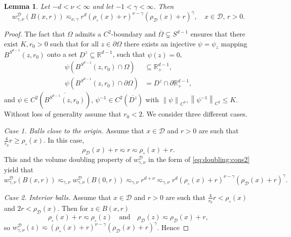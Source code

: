 \documentclass[12pt,a4paper, reqno]{amsart}
\theoremstyle{plain}
\newtheorem{lemma}[theorem]{Lemma}
\theoremstyle{definition}
\theoremstyle{remark}
\numberwithin{equation}{section}
\newcommand{\1}{\mathbbm{1}}
\newcommand{\R}{\ensuremath{\mathbb{R}}}
\newcommand{\calD}{\ensuremath{\mathcal{D}}}
\newcommand{\nrm}[1]{\left\lVert #1 \right\rVert}
\begin{document}
\begin{lemma}\label{mixedweight:estimate:ball}
Let $-d<\nu<\infty$ and let $-1<\gamma<\infty$. Then 
\begin{equation}
    w_{\gamma,\nu}^\calD(B(x,r))
    \eqsim_{\nu,\gamma} 
    r^d(\rho_\circ(x)+r)^{\nu-\gamma}(\rho_{\calD}(x)+r)^\gamma, \quad x\in \calD,\,r>0.
\end{equation}
\end{lemma}
\begin{proof} 
The fact that $\Omega$ admits a $C^2$-boundary and $\overline{\Omega}\subsetneq S^{d-1}$ ensures that there exist $K,r_0 >0$ such that for all $z\in \partial\Omega$ there exists an injective $\psi=\psi_z$ mapping $B^{S^{d-1}}(z,r_0)$ onto a set $D^z\subseteq \R^{d-1}$, such that  $ \psi(z)=0$,
\begin{align*}
    \psi(B^{S^{d-1}}(z,r_0)\cap\Omega) &\subseteq \R^{d-1}_+,\\
    \psi(B^{S^{d-1}}(z,r_0)\cap\partial \Omega)&= D^z\cap \partial\R^{d-1}_+,%
\end{align*}
and $\psi\in C^2(\overline{B^{S^{d-1}}(z,r_0)})$, $\psi^{-1}\in C^2(\overline{D^z})$
 with $\nrm{\psi}_{C^2},\nrm{\psi^{-1}}_{C^2}\le K$.  
 Without loss of generality assume that $r_0<2.$
We consider three different cases. 

\medskip

\noindent \emph{Case 1. Balls close to the origin.} Assume that $x\in \calD$ and $r>0$ are such that $\frac{4}{r_0} r\geq \rho_\circ(x)$. 
In this case,
\[
\rho_\calD(x)+r \eqsim r \eqsim \rho_\circ(x)+r.
\]
This and the volume doubling property of $w_{\gamma,\nu}^\calD$
in the form of \eqref{eq:doubling:cons2}
yield that
\[
	w_{\gamma,\nu}^\calD(B(x,r))
    \eqsim_{\gamma,\nu} 
    w_{\gamma,\nu}^\calD(B(0,r))
    \eqsim_{\gamma,\nu} 
    r^{d+\nu}
    \eqsim_{\gamma,\nu} 
    r^d(\rho_\circ(x)+r)^{\nu-\gamma}(\rho_\calD(x)+r)^\gamma.
\]

\medskip

\noindent \emph{Case 2. Interior balls.} Assume that $x\in \calD$ and $r>0$ are such that $\frac{4}{r_0} r<\rho_\circ(x)$ and $2r< \rho_\calD(x)$. 
Then for $z\in B(x,r)$
\begin{equation}\label{eq:mixedweights:equiv1}
\rho_\circ(x)+r \eqsim \rho_\circ(z) \quad\text{and}\quad \rho_\calD(z)\eqsim\rho_\calD(x)+r,
\end{equation}
so $w_{\gamma,\nu}^\calD(z) \eqsim (\rho_\circ(x)+r)^{\nu-\gamma}(\rho_\calD(x)+r)^\gamma$. Hence


\end{proof}
\end{document}
